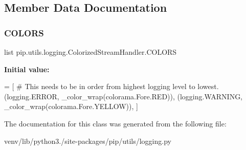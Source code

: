 \subsection{Member Data Documentation}
\mbox{\label{classpip_1_1utils_1_1logging_1_1_colorized_stream_handler_a0182edc556d65ac71f7edf150e7b87f6}} 
\subsubsection{\texorpdfstring{C\+O\+L\+O\+RS}{COLORS}}
{\footnotesize\ttfamily list pip.\+utils.\+logging.\+Colorized\+Stream\+Handler.\+C\+O\+L\+O\+RS\hspace{0.3cm}{\ttfamily [static]}}

{\bfseries Initial value\+:}
\begin{DoxyCode}
=  [
            \textcolor{comment}{# This needs to be in order from highest logging level to lowest.}
            (logging.ERROR, \_color\_wrap(colorama.Fore.RED)),
            (logging.WARNING, \_color\_wrap(colorama.Fore.YELLOW)),
        ]
\end{DoxyCode}


The documentation for this class was generated from the following file\+:\begin{DoxyCompactItemize}
\item 
venv/lib/python3./site-\/packages/pip/utils/logging.\+py\end{DoxyCompactItemize}

